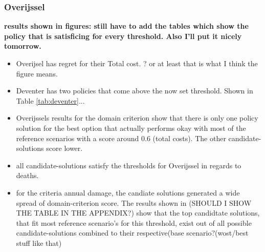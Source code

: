 \subsubsection{Overijssel}
\textbf{results shown in figures: still have to add the tables which show the policy that is satisficing for every threshold. Also I'll put it nicely tomorrow. }
\begin{itemize}
    \item Overijsel has regret for their Total cost. ? or at least that is what I think the figure means.
    \item Deventer has two policies that come above the now set threshold. Shown in Table \ref{tab:deventer}...
    \item Overijssels results for the domain criterion show that there is only one policy solution for the best option that actually performs okay with most of the reference scenarios with a score around 0.6 (total costs). The other candidate-solutions score lower. 
    \item all candidate-solutions satisfy the thresholds for Overijssel in regards to deaths.
    \item for the criteria annual damage, the candiate solutions generated a wide spread of domain-criterion score. The results shown in (SHOULD I SHOW THE TABLE IN THE APPENDIX?) show that the top candidtate solutions, that fit most reference scenario's for this threshold, exist out of all possible candidate-solutions combined to their respective(base scenario?(wost/best stuff like that)
\end{itemize}
